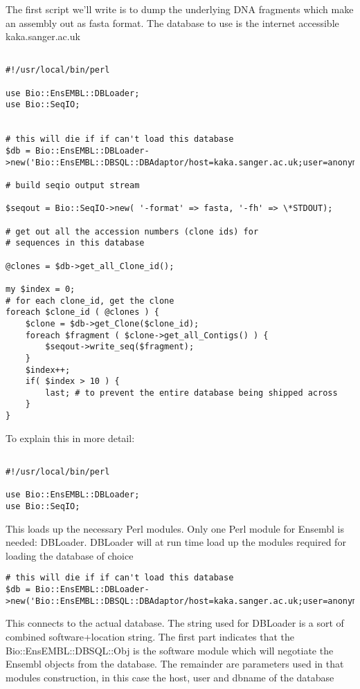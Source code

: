 \documentclass[11pt,a4paper]{article}
\begin{document}
The first script we'll write is to dump the underlying DNA fragments
which make an assembly out as fasta format. The database to use is
the internet accessible kaka.sanger.ac.uk 

\begin{verbatim}

#!/usr/local/bin/perl

use Bio::EnsEMBL::DBLoader;
use Bio::SeqIO;


# this will die if if can't load this database
$db = Bio::EnsEMBL::DBLoader->new('Bio::EnsEMBL::DBSQL::DBAdaptor/host=kaka.sanger.ac.uk;user=anonymous;dbname=current');

# build seqio output stream

$seqout = Bio::SeqIO->new( '-format' => fasta, '-fh' => \*STDOUT);

# get out all the accession numbers (clone ids) for
# sequences in this database

@clones = $db->get_all_Clone_id();

my $index = 0;
# for each clone_id, get the clone
foreach $clone_id ( @clones ) {
	$clone = $db->get_Clone($clone_id);
	foreach $fragment ( $clone->get_all_Contigs() ) {
		$seqout->write_seq($fragment);
   	}
	$index++;
	if( $index > 10 ) {
		last; # to prevent the entire database being shipped across
	}
}

\end{verbatim}

To explain this in more detail:

\begin{verbatim}

#!/usr/local/bin/perl

use Bio::EnsEMBL::DBLoader;
use Bio::SeqIO;

\end{verbatim}

This loads up the necessary Perl modules. Only one Perl module for Ensembl is needed: DBLoader.
DBLoader will at run time load up the modules required for loading the database of choice

\begin{verbatim}
# this will die if if can't load this database
$db = Bio::EnsEMBL::DBLoader->new('Bio::EnsEMBL::DBSQL::DBAdaptor/host=kaka.sanger.ac.uk;user=anonymous;dbname=current');
\end{verbatim}

This connects to the actual database. The string used for DBLoader is
a sort of combined software+location string. The first part indicates
that the Bio::EnsEMBL::DBSQL::Obj is the software module which will
negotiate the Ensembl objects from the database. The remainder are
parameters used in that modules construction, in this case the host,
user and dbname of the database
\end{document}
